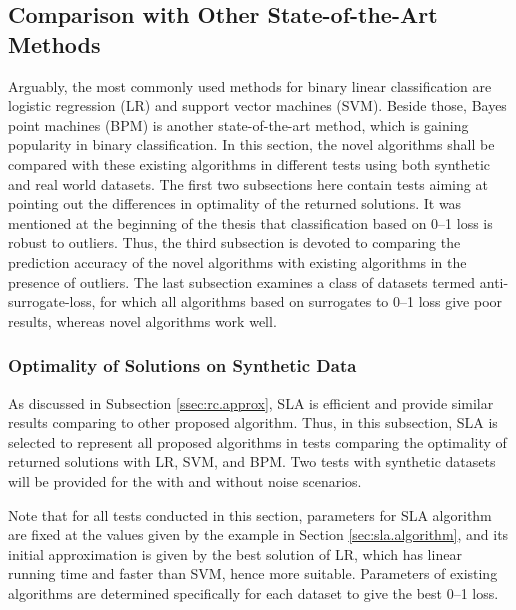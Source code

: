 \subsection{Comparison with Other State-of-the-Art Methods}
\label{sec:rc.others}

Arguably, the most commonly used methods for binary linear
classification are logistic regression (LR) and support vector
machines (SVM). Beside those, Bayes point machines (BPM) is another
state-of-the-art method, which is gaining popularity in binary
classification. In this section, the novel algorithms shall be
compared with these existing algorithms in different tests using both
synthetic and real world datasets. The first two subsections here
contain tests aiming at pointing out the differences in optimality of
the returned solutions. It was mentioned at the beginning of the
thesis that classification based on 0--1 loss is robust to
outliers. Thus, the third subsection is devoted to comparing the
prediction accuracy of the novel algorithms with existing algorithms
in the presence of outliers. The last subsection examines a class of
datasets termed anti-surrogate-loss, for which all algorithms based on
surrogates to 0--1 loss give poor results, whereas novel algorithms
work well.


\subsubsection{Optimality of Solutions on Synthetic Data}
\label{ssec:rc.optimality}

As discussed in Subsection \ref{ssec:rc.approx}, SLA is efficient and
provide similar results comparing to other proposed algorithm. Thus,
in this subsection, SLA is selected to represent all proposed
algorithms in tests comparing the optimality of returned solutions
with LR, SVM, and BPM. Two tests with synthetic datasets will be
provided for the with and without noise scenarios.

Note that for all tests conducted in this section, parameters for SLA
algorithm are fixed at the values given by the example in Section
\ref{sec:sla.algorithm}, and its initial approximation is given by the
best solution of LR, which has linear running time and faster than
SVM, hence more suitable. Parameters of existing algorithms are
determined specifically for each dataset to give the best 0--1 loss.

